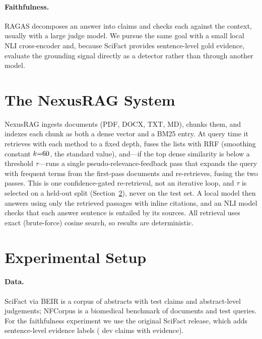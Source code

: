 \documentclass[11pt]{article}
\begin{document}
\paragraph{Faithfulness.} RAGAS \citep{es2024ragas} decomposes an answer into
claims and checks each against the context, usually with a large judge model. We
pursue the same goal with a small local NLI cross-encoder \citep{he2021deberta}
and, because SciFact provides sentence-level gold evidence, evaluate the
grounding signal directly as a detector rather than through another model.

\section{The NexusRAG System}

NexusRAG ingests documents (PDF, DOCX, TXT, MD), chunks them, and indexes each
chunk as both a dense vector and a BM25 entry. At query time it retrieves with
each method to a fixed depth, fuses the lists with RRF (smoothing constant
$k{=}60{}$, the standard value), and---if the top dense similarity is below a
threshold $\tau$---runs a single pseudo-relevance-feedback pass that expands the
query with frequent terms from the first-pass documents and re-retrieves, fusing
the two passes. This is one confidence-gated re-retrieval, not an iterative loop,
and $\tau$ is selected on a held-out split (Section~\ref{sec:setup}), never on the
test set. A local model then
answers using only the retrieved passages with inline citations, and an NLI model
checks that each answer sentence is entailed by its sources. All retrieval uses
exact (brute-force) cosine search, so results are deterministic.

\section{Experimental Setup}
\label{sec:setup}

\paragraph{Data.} SciFact via BEIR is a corpus of \CorpusSize{} abstracts with
\NumQueries{} test claims and abstract-level judgements; NFCorpus is a biomedical
benchmark of \NFcorpus{} documents and \NFqueries{} test queries. For the
faithfulness experiment we use the original SciFact release, which adds
sentence-level evidence labels (\FaithClaims{} dev claims with evidence).
\end{document}
